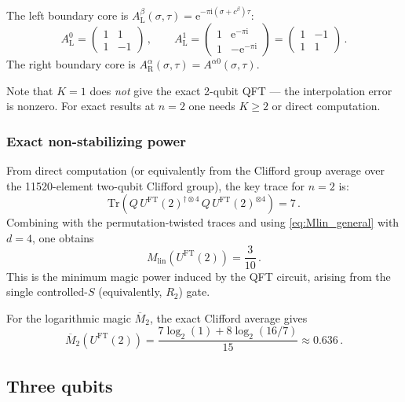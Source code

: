 \documentclass[11pt,a4paper]{article}
\theoremstyle{definition}
\theoremstyle{remark}
\newcommand{\Mlin}{M_{\mathrm{lin}}}
\newcommand{\Mtwo}{\overline{M}_2}
\newcommand{\UFT}{U^{\mathrm{FT}}}
\renewcommand{\Tr}{\mathrm{Tr}}
\newcommand{\ee}{\mathrm{e}}
\newcommand{\ii}{\mathrm{i}}
\begin{document}
The left boundary core is $A_{\mathrm{L}}^\beta(\sigma,\tau) = \ee^{-\pi\ii(\sigma+c^\beta)\tau}$:
\begin{equation}
  A_{\mathrm{L}}^0 = \begin{pmatrix} 1 & 1\\1 & -1\end{pmatrix}\,,\qquad
  A_{\mathrm{L}}^1 = \begin{pmatrix} 1 & \ee^{-\pi\ii}\\1 & -\ee^{-\pi\ii}\end{pmatrix}
  = \begin{pmatrix} 1 & -1\\1 & 1\end{pmatrix}\,.
\end{equation}
The right boundary core is $A_{\mathrm{R}}^\alpha(\sigma,\tau) = A^{\alpha 0}(\sigma,\tau)$.

Note that $K=1$ does \emph{not} give the exact 2-qubit QFT --- the interpolation error is nonzero. For exact results at $n=2$ one needs $K\ge 2$ or direct computation.

\subsubsection{Exact non-stabilizing power}

From direct computation (or equivalently from the Clifford group average over the 11520-element two-qubit Clifford group), the key trace for $n=2$ is:
\begin{equation}
  \Tr(Q\,\UFT(2)^{\dagger\otimes 4}\,Q\,\UFT(2)^{\otimes 4}) = 7\,.
\end{equation}
Combining with the permutation-twisted traces and using \eqref{eq:Mlin_general} with $d=4$, one obtains
\begin{equation}
  \Mlin(\UFT(2)) = \frac{3}{10}\,.
\end{equation}
This is the minimum magic power induced by the QFT circuit, arising from the single controlled-$S$ (equivalently, $R_2$) gate.

For the logarithmic magic $\Mtwo$, the exact Clifford average gives
\begin{equation}
  \Mtwo(\UFT(2)) = \frac{7\log_2(1) + 8\log_2(16/7)}{15} \approx 0.636\,.
\end{equation}

\subsection{Three qubits}
\end{document}
